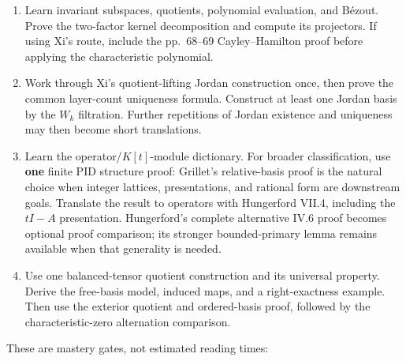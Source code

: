 \documentclass[
  11pt,
]{article}
\providecommand{\tightlist}{%
  \setlength{\itemsep}{0pt}\setlength{\parskip}{0pt}}
\begin{document}
\begin{enumerate}
\def\labelenumi{\arabic{enumi}.}
\tightlist
\item
  Learn invariant subspaces, quotients, polynomial evaluation, and
  Bézout. Prove the two-factor kernel decomposition and compute its
  projectors. If using Xi's route, include the pp.~68--69
  Cayley--Hamilton proof before applying the characteristic polynomial.
\item
  Work through Xi's quotient-lifting Jordan construction once, then
  prove the common layer-count uniqueness formula. Construct at least
  one Jordan basis by the \(W_k\) filtration. Further repetitions of
  Jordan existence and uniqueness may then become short translations.
\item
  Learn the operator/\(K[t]\)-module dictionary. For broader
  classification, use \textbf{one} finite PID structure proof: Grillet's
  relative-basis proof is the natural choice when integer lattices,
  presentations, and rational form are downstream goals. Translate the
  result to operators with Hungerford VII.4, including the \(tI-A\)
  presentation. Hungerford's complete alternative IV.6 proof becomes
  optional proof comparison; its stronger bounded-primary lemma remains
  available when that generality is needed.
\item
  Use one balanced-tensor quotient construction and its universal
  property. Derive the free-basis model, induced maps, and a
  right-exactness example. Then use the exterior quotient and
  ordered-basis proof, followed by the characteristic-zero alternation
  comparison.
\end{enumerate}

These are mastery gates, not estimated reading times:
\end{document}
